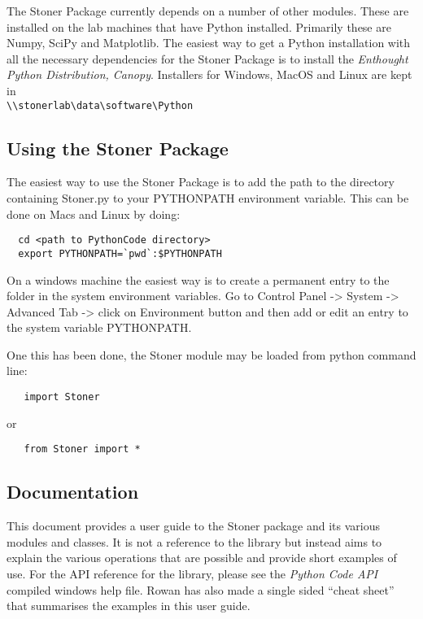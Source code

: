 \documentclass[a4paper,11pt]{scrartcl}
\begin{document}
The Stoner Package currently depends on a number of other modules. These are installed on the lab 
machines that have Python installed. Primarily these are Numpy, SciPy and Matplotlib.  The easiest way to get a Python
installation with all the necessary dependencies for the Stoner Package is to install the \textit{Enthought Python Distribution, Canopy}. Installers for Windows, MacOS and Linux are
kept in \\ \verb#\\stonerlab\data\software\Python#


\subsection{Using the Stoner Package}


The easiest way to use the Stoner Package is to add the path to the directory
containing Stoner.py to your PYTHONPATH environment variable. This can be done
on Macs and Linux by doing:
\begin{lstlisting}
  cd <path to PythonCode directory>
  export PYTHONPATH=`pwd`:$PYTHONPATH
\end{lstlisting}
On a windows machine the easiest way is to create a permanent entry to the
folder in the system environment variables. Go to Control Panel -> System ->
Advanced Tab -> click on Environment button and then add or edit an entry to the
system variable PYTHONPATH.

One this has been done, the Stoner module may be loaded from python command
line:

\begin{lstlisting}
   import Stoner
\end{lstlisting}

or

\begin{lstlisting}
   from Stoner import *
\end{lstlisting}

\subsection{Documentation}

This document provides a user guide to the Stoner package and its various modules and classes. It is not a reference to the library but instead aims to explain the various operations that are possible and provide short examples of use. For the API reference for the library, please see the \textit{Python Code API} compiled windows help file. Rowan has also made a single sided ``cheat sheet'' that summarises the examples in this user guide.
\end{document}
